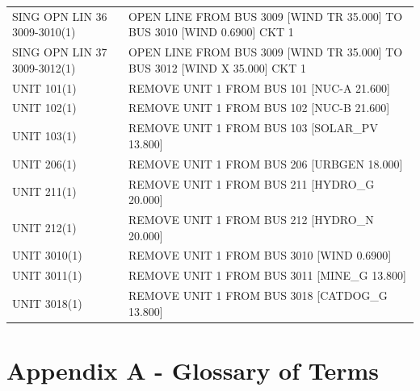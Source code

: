\documentclass[10pt]{report}
\begin{document}
\begin{table}
{\begin{tabular}{ll}
SING OPN LIN   36 3009-3010(1) & OPEN LINE FROM BUS 3009 [WIND TR 35.000] TO BUS 3010 [WIND 0.6900] CKT 1 \\
SING OPN LIN   37 3009-3012(1) & OPEN LINE FROM BUS 3009 [WIND TR 35.000] TO BUS 3012 [WIND X 35.000] CKT 1 \\
UNIT 101(1) & REMOVE UNIT 1 FROM BUS 101 [NUC-A 21.600] \\
UNIT 102(1) & REMOVE UNIT 1 FROM BUS 102 [NUC-B 21.600] \\
UNIT 103(1) & REMOVE UNIT 1 FROM BUS 103 [SOLAR\_PV 13.800] \\
UNIT 206(1) & REMOVE UNIT 1 FROM BUS 206 [URBGEN 18.000] \\
UNIT 211(1) & REMOVE UNIT 1 FROM BUS 211 [HYDRO\_G 20.000] \\
UNIT 212(1) & REMOVE UNIT 1 FROM BUS 212 [HYDRO\_N 20.000] \\
UNIT 3010(1) & REMOVE UNIT 1 FROM BUS 3010 [WIND 0.6900] \\
UNIT 3011(1) & REMOVE UNIT 1 FROM BUS 3011 [MINE\_G 13.800] \\
UNIT 3018(1) & REMOVE UNIT 1 FROM BUS 3018 [CATDOG\_G 13.800] \\
\bottomrule
\end{tabular}}
\end{table}



\chapter*{Appendix A - Glossary of Terms}
\label{chapter:glos}
\end{document}

